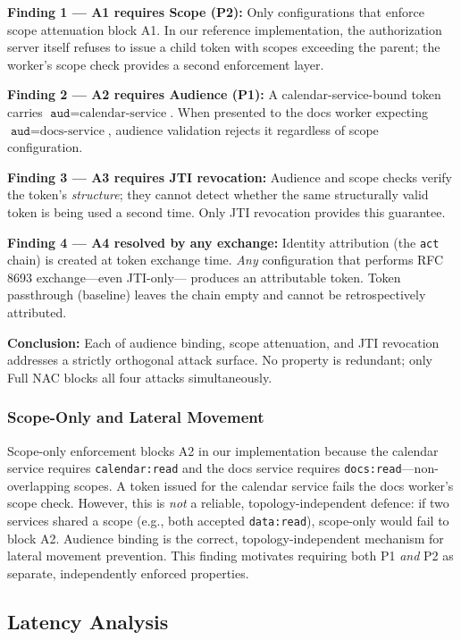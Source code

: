 \documentclass[journal]{IEEEtran}
\begin{document}
\textbf{Finding 1 — A1 requires Scope (P2):}
Only configurations that enforce scope attenuation block A1. In our reference
implementation, the authorization server itself refuses to issue a child token
with scopes exceeding the parent; the worker's scope check provides a second
enforcement layer.

\textbf{Finding 2 — A2 requires Audience (P1):}
A calendar-service-bound token carries $\texttt{aud}=\text{calendar-service}$.
When presented to the docs worker expecting $\texttt{aud}=\text{docs-service}$,
audience validation rejects it regardless of scope configuration.

\textbf{Finding 3 — A3 requires JTI revocation:}
Audience and scope checks verify the token's \textit{structure}; they cannot
detect whether the same structurally valid token is being used a second time.
Only JTI revocation provides this guarantee.

\textbf{Finding 4 — A4 resolved by any exchange:}
Identity attribution (the \texttt{act} chain) is created at token exchange time.
\textit{Any} configuration that performs RFC 8693 exchange---even JTI-only---
produces an attributable token. Token passthrough (baseline) leaves the chain
empty and cannot be retrospectively attributed.

\textbf{Conclusion:}
Each of audience binding, scope attenuation, and JTI revocation addresses a
strictly orthogonal attack surface. No property is redundant; only Full NAC
blocks all four attacks simultaneously.

\subsubsection{Scope-Only and Lateral Movement}
\label{sec:scope_caveat}

Scope-only enforcement blocks A2 in our implementation because the calendar
service requires \texttt{calendar:read} and the docs service requires
\texttt{docs:read}---non-overlapping scopes. A token issued for the calendar
service fails the docs worker's scope check. However, this is \textit{not} a
reliable, topology-independent defence: if two services shared a scope (e.g.,
both accepted \texttt{data:read}), scope-only would fail to block A2. Audience
binding is the correct, topology-independent mechanism for lateral movement
prevention. This finding motivates requiring both P1 \textit{and} P2 as
separate, independently enforced properties.

\subsection{Latency Analysis}
\end{document}

